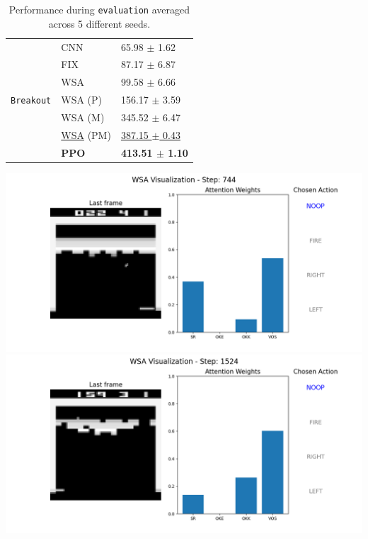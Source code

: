\begin{table}[ht]
\begin{minipage}[b]{0.49\linewidth}
\begin{tabular}[b]{lll}
                \multirow{7}{*}{\texttt{Breakout}}
                                      & CNN & 65.98 $\pm$ 1.62 \\
                                      & FIX & 87.17 $\pm$ 6.87 \\
                                      & WSA & 99.58 $\pm$ 6.66 \\
                                      & WSA (P) & 156.17 $\pm$ 3.59 \\
                                      & WSA (M) & 345.52 $\pm$ 6.47 \\
                                      & \underline{WSA} (PM)& \underline{387.15 $\pm$ 0.43} \\
                                      & \textbf{PPO} & \textbf{413.51 $\pm$ 1.10}\\
    \end{tabular}
    \caption{Performance during \texttt{evaluation} averaged across 5 different seeds.}
    \label{tab:results}
\end{minipage}\hfill
\begin{minipage}[b]{0.49\linewidth}
\centering
\includegraphics[width=\textwidth]{images/744.png}
\includegraphics[width=\textwidth]{images/1524.png}
\label{fig:inter}
\end{minipage}
\end{table}